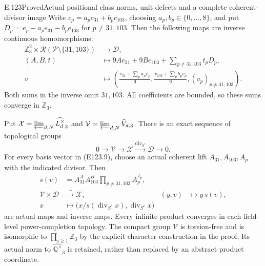 \begin{statement}{E.123}{Proved}{Actual positional class norms, unit defects and a complete coherent-divisor image}
Write $c_p=a_pc_{31}+b_pc_{103}$, choosing $a_p,b_p\in\{0,\ldots,8\}$,
and put $D_p=e_p-a_pe_{31}-b_pe_{103}$ for $p\ne31,103$.
Then the following maps are inverse continuous homomorphisms:
\[
 \begin{aligned}
 \mathbb Z_3^2\times\mathcal R(\mathcal P\setminus\{31,103\})
 &\longrightarrow\mathcal D,\\
 (A,B,t)&\longmapsto
       9Ae_{31}+9Be_{103}+\sum_{p\ne31,103}t_pD_p,\\
 v&\longmapsto
 \left(\frac{v_{31}+\sum_pa_pv_p}{9},
       \frac{v_{103}+\sum_pb_pv_p}{9},
       (v_p)_{p\ne31,103}\right).
 \end{aligned}
 \tag{E123.9}
\]
Both sums in the inverse omit $31,103$. All coefficients are bounded,
so these sums converge in $\mathbb Z_3$.

Put
$\mathcal X=\varprojlim_{d,N}\widehat{L_d^\times}_3$ and
$\mathcal V=\varprojlim_{d,N}\widehat V_{d,3}$.
There is an exact sequence of topological groups
\[
 0\longrightarrow\mathcal V\longrightarrow\mathcal X
       \xrightarrow{\operatorname{div}_{S^c}}\mathcal D
       \longrightarrow0.
 \tag{E123.10}
\]
For every basis vector in (E123.9), choose an actual coherent lift
$A_{31},A_{103},A_p$ with the indicated divisor.
Then
\[
 \begin{aligned}
 s(v)&=A_{31}^{A}A_{103}^{B}\prod_{p\ne31,103}A_p^{\,t_p},\\
 \mathcal V\times\mathcal D&\xrightarrow{\sim}\mathcal X,
       &(y,v)&\longmapsto y\,s(v),\\
 x&\longmapsto
       \bigl(x/s(\operatorname{div}_{S^c}x),
             \operatorname{div}_{S^c}x\bigr)
 \end{aligned}
 \tag{E123.11}
\]
are actual maps and inverse maps. Every infinite product converges
in each field-level power-completion topology. The compact group
$\mathcal V$ is torsion-free and is isomorphic to
$\prod_{i\ge1}\mathbb Z_3$ by the explicit character construction in
the proof. Its actual norm to $\widehat{\mathbb Q^\times}_3$ is retained,
rather than replaced by an abstract product coordinate.


\end{statement}
